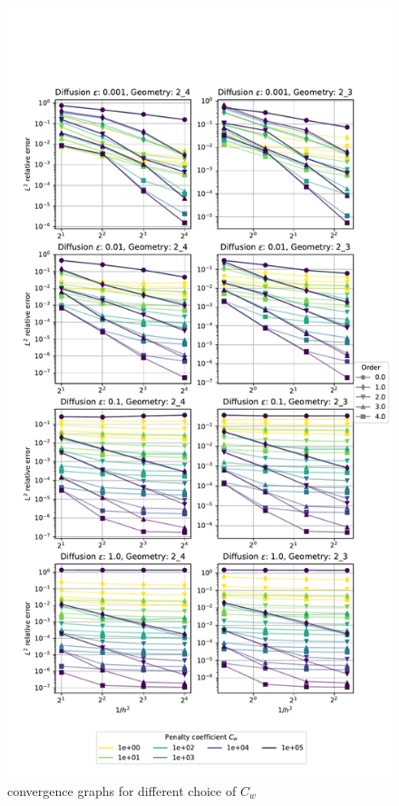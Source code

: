 \begin{figure}[p!]
	\centering
	\includegraphics[height=\textheight]{../figs/parametric/advdiff_2D/quarteroni2}
	
	\caption{ convergence graphs for different choice of $C_w$}
	\label{fig:conv_qart2}
\end{figure}
